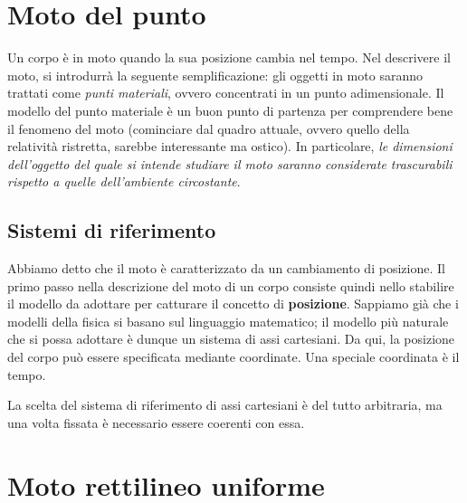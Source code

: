 

\marginpar{\minitoc}

\section{Moto del punto}
Un corpo è in moto quando la sua posizione cambia nel tempo. Nel descrivere il
moto, si introdurrà la seguente semplificazione: gli oggetti in moto saranno
trattati come \textit{punti materiali}, ovvero concentrati in un punto
adimensionale. Il modello del punto materiale è un buon punto di partenza per
comprendere bene il fenomeno del moto (cominciare dal quadro attuale, ovvero
quello della relatività ristretta, sarebbe interessante ma ostico). In particolare,
\textit{le dimensioni dell'oggetto del quale si intende studiare il moto saranno
considerate trascurabili rispetto a quelle dell'ambiente circostante}.

\subsection{Sistemi di riferimento}
Abbiamo detto che il moto è caratterizzato da un cambiamento di posizione. Il primo
passo nella descrizione del moto di un corpo consiste quindi nello stabilire il
modello da adottare per catturare il concetto di \textbf{posizione}. Sappiamo già
che i modelli della fisica si basano sul linguaggio matematico; il modello più
naturale che si possa adottare è dunque un sistema di assi cartesiani. Da qui, la
posizione del corpo può essere specificata mediante coordinate. Una speciale
coordinata è il tempo.

La scelta del sistema di riferimento di assi cartesiani è del tutto arbitraria,
ma una volta fissata è necessario essere coerenti con essa.


\section{Moto rettilineo uniforme}

